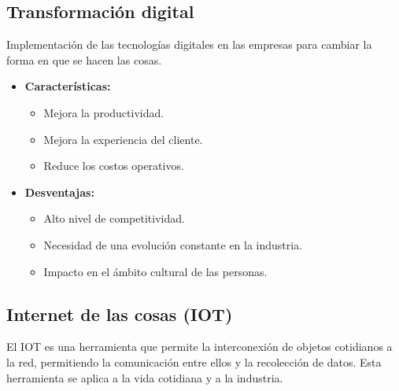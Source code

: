 \documentclass{templateNote}
\begin{document}
\subsection{Transformación digital}
\noindent Implementación de las tecnologías digitales en las empresas para cambiar la forma en que se hacen las cosas. \\
\begin{minipage}{0.45\textwidth}
    \begin{itemize}
        \item \textbf{Características:}
        \begin{itemize}
            \item Mejora la productividad.
            \item Mejora la experiencia del cliente.
            \item Reduce los costos operativos.
        \end{itemize}
    \end{itemize}
\end{minipage}
\hspace{1cm}
\begin{minipage}{0.45\textwidth}
    \begin{itemize}
        \item \textbf{Desventajas:}
        \begin{itemize}
            \item Alto nivel de competitividad.
            \item Necesidad de una evolución constante en la industria.
            \item Impacto en el ámbito cultural de las personas.
        \end{itemize}
    \end{itemize}
\end{minipage}


\subsection{Internet de las cosas (IOT)}
\noindent El IOT es una herramienta que permite la interconexión de objetos cotidianos a la red, permitiendo la comunicación entre ellos y la recolección de datos. Esta herramienta se aplica a la vida cotidiana y a la industria.
\end{document}
